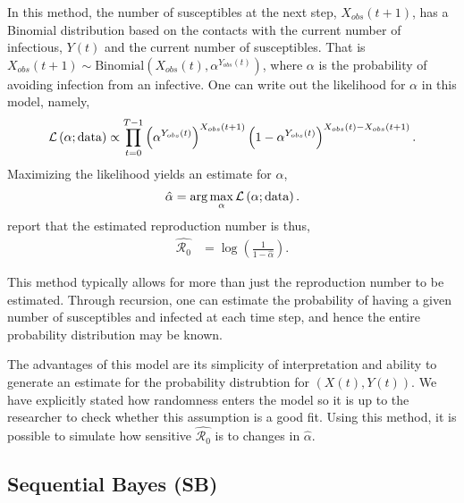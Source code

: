 \documentclass[12pt]{article}
\newcommand{\rr}{\ensuremath{\mathcal{R}_0}}
\begin{document}
In this method, the number of susceptibles at the next step, $X_{obs}(t+1)$, has a Binomial distribution based on the contacts with the current number of infectious, $Y(t)$ and the current number of susceptibles.  That is $X_{obs}(t+1) \sim \text{Binomial}\left(X_{obs}(t), \alpha^{Y_{obs}(t)}\right)$, where $\alpha$ is the probability of avoiding infection from an infective.  One can write out the likelihood for $\alpha$ in this model, namely,
\begin{align*}
\mathcal{L}\left ( \alpha ; \textnormal{data}\right ) \propto \prod_{t=0}^{T-1}\left ( \alpha^{Y_{obs}(t)} \right )^{X_{obs}(t+1)} \left (1- \alpha^{Y_{obs}(t)} \right )^{X_{obs}(t) - X_{obs}(t+1)}.
\end{align*}
Maximizing the likelihood yields an estimate for $\alpha$,
\begin{align*}
\hat{\alpha} = \arg \max_{\alpha} \mathcal{L}\left(\alpha; \textnormal{data} \right ).
  \end{align*}
 \cite{barbour2004} report that the estimated reproduction number is thus,
\begin{align}\label{eq:r0-mc}
\hat{\rr} &= \log \left ( \frac{1}{1-\hat{\alpha}}\right ).
\end{align}

This method typically allows for more than just the reproduction number to be estimated.  Through recursion, one can estimate the probability of having a given number of susceptibles and infected at each time step, and hence the entire probability distribution may be known.

The advantages of this model are its simplicity of interpretation and ability to generate an estimate for the probability distrubtion for $(X(t), Y(t))$.  We have explicitly stated how randomness enters the model so it is up to the researcher to check whether this assumption is a good fit.  Using this method, it is possible to simulate how sensitive $\hat{\rr}$ is to changes in $\hat{\alpha}$.





\subsection{Sequential Bayes (SB)}\label{sec:seqbayes}
\end{document}
